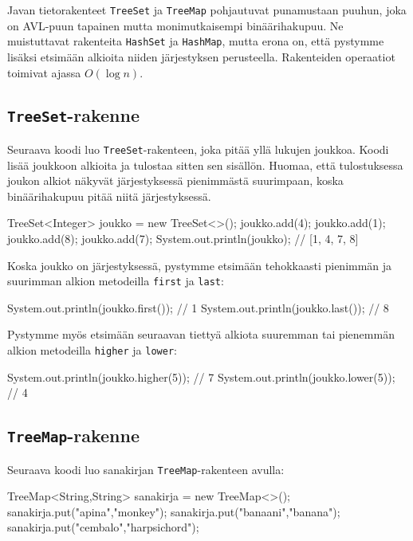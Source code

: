 Javan tietorakenteet \texttt{TreeSet} ja \texttt{TreeMap}
pohjautuvat punamustaan puuhun,
joka on AVL-puun tapainen mutta monimutkaisempi
binäärihakupuu.
Ne muistuttavat rakenteita \texttt{HashSet} ja \texttt{HashMap},
mutta erona on, että pystymme lisäksi etsimään
alkioita niiden järjestyksen perusteella.
Rakenteiden operaatiot toimivat ajassa $O(\log n)$.

\subsection{\texttt{TreeSet}-rakenne}

Seuraava koodi luo \texttt{TreeSet}-rakenteen,
joka pitää yllä lukujen joukkoa.
Koodi lisää joukkoon alkioita ja tulostaa sitten sen sisällön.
Huomaa, että tulostuksessa joukon alkiot näkyvät
järjestyksessä pienimmästä suurimpaan, koska
binäärihakupuu pitää niitä järjestyksessä.

\begin{code}
TreeSet<Integer> joukko = new TreeSet<>();
joukko.add(4);
joukko.add(1);
joukko.add(8);
joukko.add(7);
System.out.println(joukko); // [1, 4, 7, 8]
\end{code}

Koska joukko on järjestyksessä, pystymme etsimään tehokkaasti
pienim\-män ja suurimman alkion metodeilla \texttt{first} ja \texttt{last}:

\begin{code}
System.out.println(joukko.first()); // 1
System.out.println(joukko.last()); // 8
\end{code}

Pystymme myös etsimään seuraavan tiettyä alkiota
suuremman tai pienemmän alkion metodeilla \texttt{higher} ja \texttt{lower}:

\begin{code}
System.out.println(joukko.higher(5)); // 7
System.out.println(joukko.lower(5)); // 4
\end{code}

\subsection{\texttt{TreeMap}-rakenne}

Seuraava koodi luo sanakirjan \texttt{TreeMap}-rakenteen avulla:

\begin{code}
TreeMap<String,String> sanakirja = new TreeMap<>();
sanakirja.put("apina","monkey");
sanakirja.put("banaani","banana");
sanakirja.put("cembalo","harpsichord");
\end{code}

